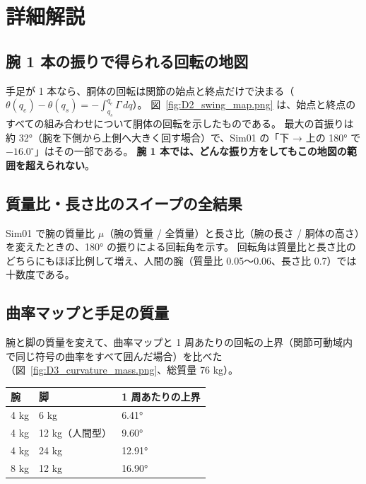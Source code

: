 \section{詳細解説}

\subsection{腕 1 本の振りで得られる回転の地図}

手足が 1 本なら、胴体の回転は関節の始点と終点だけで決まる（$\theta(q_e)-\theta(q_s)=-\int_{q_s}^{q_e}\Gamma\,dq$）。
図~\ref{fig:D2_swing_map.png} は、始点と終点のすべての組み合わせについて胴体の回転を示したものである。
最大の首振りは約 32°（腕を下側から上側へ大きく回す場合）で、Sim01 の「下 → 上の 180° で $-16.0^\circ$」はその一部である。
\textbf{腕 1 本では、どんな振り方をしてもこの地図の範囲を超えられない}。


\subsection{質量比・長さ比のスイープの全結果}

Sim01 で腕の質量比 $\mu$（腕の質量 / 全質量）と長さ比（腕の長さ / 胴体の高さ）を変えたときの、180° の振りによる回転角を示す。
回転角は質量比と長さ比のどちらにもほぼ比例して増え、人間の腕（質量比 0.05〜0.06、長さ比 0.7）では十数度である。


\subsection{曲率マップと手足の質量}

腕と脚の質量を変えて、曲率マップと 1 周あたりの回転の上界（関節可動域内で同じ符号の曲率をすべて囲んだ場合）を比べた（図~\ref{fig:D3_curvature_mass.png}、総質量 76 kg）。

\begin{center}\begin{tabular}{lll}
\toprule
腕 & 脚 & 1 周あたりの上界 \\ \midrule
4 kg & 6 kg & 6.41° \\
4 kg & 12 kg（人間型） & 9.60° \\
4 kg & 24 kg & 12.91° \\
8 kg & 12 kg & 16.90° \\
\bottomrule
\end{tabular}\end{center}


